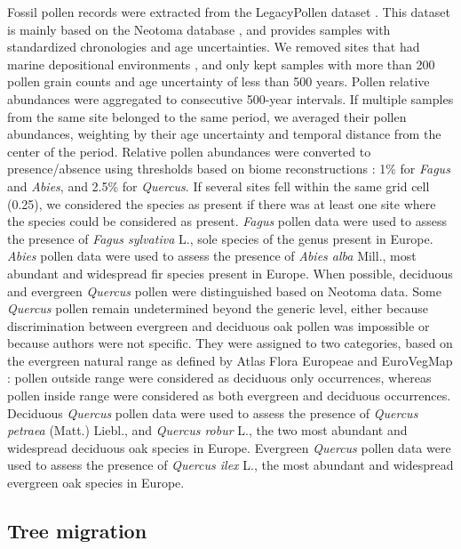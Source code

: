 \documentclass[9pt,twocolumn,twoside]{pnas-new}
\begin{document}
{Fossil pollen records were extracted from the LegacyPollen dataset \cite{Herzschuh2022}. This dataset is mainly based on the Neotoma database \cite{Williams2018}, and provides samples with standardized chronologies and age uncertainties. We removed sites that had marine depositional environments \cite{Maguire2016}, and only kept samples with more than 200 pollen grain counts and age uncertainty of less than 500 years.
Pollen relative abundances were aggregated to consecutive 500-year intervals. If multiple samples from the same site belonged to the same period, we averaged their pollen abundances, weighting by their age uncertainty and temporal distance from the center of the period. Relative pollen abundances were converted to presence/absence using thresholds based on biome reconstructions \cite{Williams1998}: 1\% for \emph{Fagus} and \emph{Abies}, and 2.5\% for \emph{Quercus}. If several sites fell within the same grid cell (0.25\degree), we considered the species as present if there was at least one site where the species could be considered as present. \textit{Fagus} pollen data were used to assess the presence of \textit{Fagus sylvativa} L., sole species of the genus present in Europe. \textit{Abies} pollen data were used to assess the presence of \textit{Abies alba} Mill., most abundant and widespread fir species present in Europe. When possible, deciduous and evergreen \textit{Quercus} pollen were distinguished based on Neotoma data. Some \textit{Quercus} pollen remain undetermined beyond the generic level, either because discrimination between evergreen and deciduous oak pollen was impossible or because authors were not specific. They were assigned to two categories, based on the evergreen natural range as defined by Atlas Flora Europeae \cite{AFE2005} and EuroVegMap \cite{EVM2003}: pollen outside range were considered as deciduous only occurrences, whereas pollen inside range were considered as both evergreen and deciduous occurrences. Deciduous \textit{Quercus} pollen data were used to assess the presence of \textit{Quercus} \textit{petraea}  (Matt.) Liebl., and \textit{Quercus robur} L., the two most abundant and widespread deciduous oak species in Europe. Evergreen \textit{Quercus} pollen data were used to assess the presence of \textit{Quercus ilex} L., the most abundant and widespread evergreen oak species in Europe.

\subsection*{Tree migration}\label{migration}

}
\end{document}
